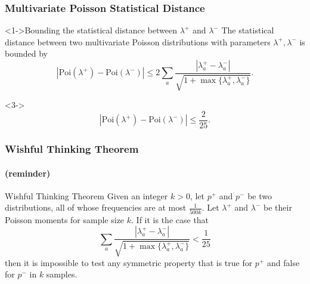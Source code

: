 \documentclass[handout]{beamer}
\begin{document}
\begin{frame}
  \frametitle{Multivariate Poisson Statistical Distance}
    \begin{block}<1->{Bounding the statistical distance between $\lambda^+$ and $\lambda^-$}
      The statistical distance between two multivariate Poisson
      distributions with parameters $\lambda^+, \lambda^-$ is bounded
      by
      \begin{equation*}
        |\mbox{Poi}(\lambda^+)-\mbox{Poi}(\lambda^-)|\le 2\sum_a\frac{|\lambda^+_a-\lambda^-_a|}{\sqrt{1+\max\{\lambda^+_a,\lambda_a^-\}}}.
      \end{equation*}
    \end{block}
    \begin{block}<3->{}
      \begin{equation*}
        |\mbox{Poi}(\lambda^+)-\mbox{Poi}(\lambda^-)|\le \frac{2}{25}.
      \end{equation*}
    \end{block}
\end{frame}

\begin{frame}
  \frametitle{Wishful Thinking Theorem} \framesubtitle{(reminder)}

  \begin{block}{Wishful Thinking Theorem}
    Given an integer $k>0$, let $p^+$ and $p^-$ be two distributions,
    all of whose frequencies are at most $\frac{1}{500k}$. Let
    $\lambda^+$ and $\lambda^-$ be their Poisson moments for sample
    size $k$. If it is the case that
    \begin{equation*}
      \sum_a\frac{|\lambda^+_a-\lambda^-_a|}{\sqrt{1+\max\{\lambda^+_a,\lambda^-_a\}}}<\frac{1}{25}
    \end{equation*}
    then it is impossible to test any symmetric property that is true
    for $p^+$ and false for $p^-$ in $k$ samples.
  \end{block}

\end{frame}
\end{document}
